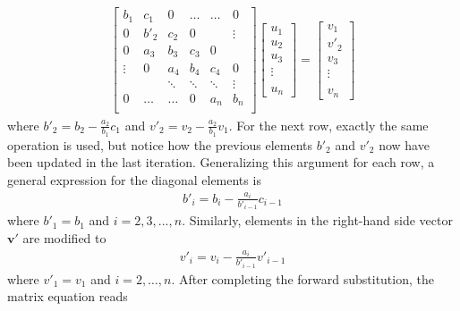 \documentclass[aps,prl,reprint,toc]{revtex4-1}
\begin{document}
\begin{align*}
  \begin{bmatrix}
    b_1 & c_1 & 0  & \hdots & \hdots &   0    \\
    0 & b'_2 & c_2 & 0      & &\vdots \\
    0 & a_3 & b_3  & c_3     & 0 &  \\
    \vdots & 0 & a_4  & b_4     & c_4 & 0 \\
    & & \ddots & \ddots & \ddots & \vdots\\
    0 & \hdots  &\hdots & 0 &a_n & b_n \\
  \end{bmatrix}
  \begin{bmatrix}
    u_1 \\ u_2 \\ u_3 \\ \vdots \\ \\ u_n
  \end{bmatrix}
  =
  \begin{bmatrix}
    v_1 \\ v'_2 \\ v_3 \\ \vdots \\ \\ v_n
  \end{bmatrix}
\end{align*}
where $b'_2 = b_2 - \frac{a_2}{b_1} c_1$ and $v'_2 = v_2 - \frac{a_2}{b_1}v_1$.
For the next row, exactly the same operation is used, but notice how the previous
elements $b'_2$ and $v'_2$ now have been updated in the last iteration. Generalizing this
argument for each row, a general expression for the diagonal elements is
\begin{align*}
  b'_i = b_i - \frac{a_i}{b'_{i-1}}c_{i-1}
\end{align*}
where $b'_1 = b_1$ and $i = 2,3,...,n$. Similarly, elements in the right-hand side vector
$\mathbf{v}'$ are modified to
\begin{align*}
  v'_{i} = v_i - \frac{a_i}{b'_{i-1}}v'_{i-1}
\end{align*}
where $v'_1 = v_1$ and $i = 2,\hdots,n$. After completing the forward substitution,
the matrix equation reads
\end{document}
